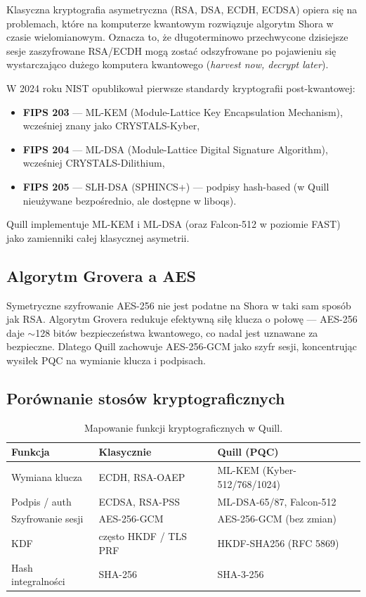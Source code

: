 \documentclass[12pt,a4paper]{article}
\begin{document}
Klasyczna kryptografia asymetryczna (RSA, DSA, ECDH, ECDSA) opiera się na problemach, które na komputerze kwantowym rozwiązuje algorytm Shora w czasie wielomianowym. Oznacza to, że długoterminowo przechwycone dzisiejsze sesje zaszyfrowane RSA/ECDH mogą zostać odszyfrowane po pojawieniu się wystarczająco dużego komputera kwantowego (\emph{harvest now, decrypt later}).

W 2024 roku NIST opublikował pierwsze standardy kryptografii post-kwantowej:
\begin{itemize}
    \item \textbf{FIPS 203} --- ML-KEM (Module-Lattice Key Encapsulation Mechanism), wcześniej znany jako CRYSTALS-Kyber,
    \item \textbf{FIPS 204} --- ML-DSA (Module-Lattice Digital Signature Algorithm), wcześniej CRYSTALS-Dilithium,
    \item \textbf{FIPS 205} --- SLH-DSA (SPHINCS+) --- podpisy hash-based (w Quill nieużywane bezpośrednio, ale dostępne w liboqs).
\end{itemize}

Quill implementuje ML-KEM i ML-DSA (oraz Falcon-512 w poziomie FAST) jako zamienniki całej klasycznej asymetrii.

\subsection{Algorytm Grovera a AES}

Symetryczne szyfrowanie AES-256 nie jest podatne na Shora w taki sam sposób jak RSA. Algorytm Grovera redukuje efektywną siłę klucza o połowę --- AES-256 daje $\sim$128 bitów bezpieczeństwa kwantowego, co nadal jest uznawane za bezpieczne. Dlatego Quill zachowuje AES-256-GCM jako szyfr sesji, koncentrując wysiłek PQC na wymianie klucza i podpisach.

\subsection{Porównanie stosów kryptograficznych}

\begin{table}[H]
\centering
\begin{tabular}{@{}p{3.5cm}p{4.5cm}p{5.5cm}@{}}
\toprule
\textbf{Funkcja} & \textbf{Klasycznie} & \textbf{Quill (PQC)} \\
\midrule
Wymiana klucza & ECDH, RSA-OAEP & ML-KEM (Kyber-512/768/1024) \\
Podpis / auth & ECDSA, RSA-PSS & ML-DSA-65/87, Falcon-512 \\
Szyfrowanie sesji & AES-256-GCM & AES-256-GCM (bez zmian) \\
KDF & często HKDF / TLS PRF & HKDF-SHA256 (RFC 5869) \\
Hash integralności & SHA-256 & SHA-3-256 \\
\bottomrule
\end{tabular}
\caption{Mapowanie funkcji kryptograficznych w Quill.}
\end{table}
\end{document}
